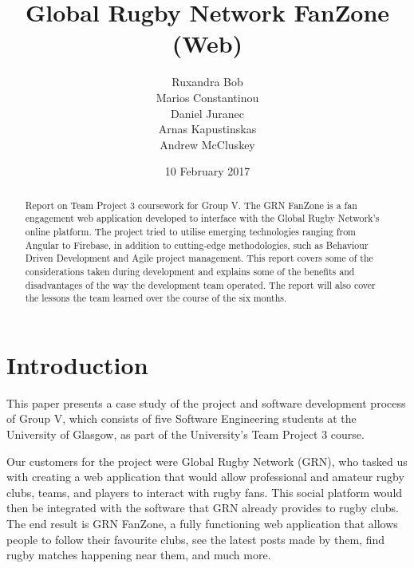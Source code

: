 \documentclass{l3proj}
\begin{document}
\title{Global Rugby Network FanZone (Web)}
\author{Ruxandra Bob \\
		Marios Constantinou \\
        Daniel Juranec \\
        Arnas Kapustinskas \\
        Andrew McCluskey}
\date{10 February 2017}
\maketitle
\begin{abstract}
Report on Team Project 3 coursework for Group V. The GRN FanZone is a
 fan engagement web application developed to interface with the Global Rugby
 Network's online platform. The project tried to utilise
 emerging technologies ranging from Angular to Firebase, in addition to
 cutting-edge methodologies, such as Behaviour Driven Development and Agile
 project management. This report covers some of the considerations taken
 during development and explains some of the benefits and disadvantages
 of the way the development team operated. The report will also cover the lessons
 the team learned over the course of the six months.
\end{abstract}
\educationalconsent
\newpage
\section{Introduction} %

This paper presents a case study of the project and software development process
 of Group V, which consists of five Software Engineering students at the
 University of Glasgow, as part of the University's Team Project 3 course.

Our customers for the project were Global Rugby Network (GRN), who tasked us
 with creating a web application that would allow professional and amateur
 rugby clubs, teams, and players to interact with rugby fans. This social
 platform would then be integrated with the software that GRN already provides
 to rugby clubs. The end result is GRN FanZone, a fully functioning web application
 that allows people to follow their favourite clubs, see the latest posts
 made by them, find rugby matches happening near them, and much more.
\end{document}
